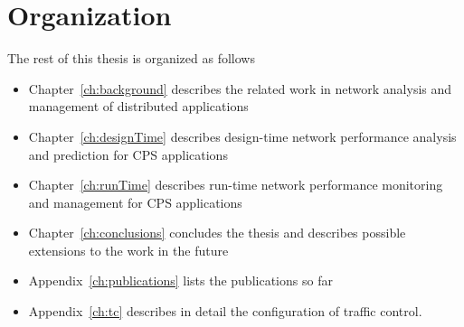 \section{Organization}
\label{sec:organization}
The rest of this thesis is organized as follows
\begin{itemize}
\item Chapter~\ref{ch:background} describes the related work in
  network analysis and management of distributed applications
\item Chapter~\ref{ch:designTime} describes design-time network
  performance analysis and prediction for CPS applications
\item Chapter~\ref{ch:runTime} describes run-time network performance
  monitoring and management for CPS applications
\item Chapter~\ref{ch:conclusions} concludes the thesis and describes
  possible extensions to the work in the future
\item Appendix~\ref{ch:publications} lists the publications so far
\item Appendix~\ref{ch:tc} describes in detail the configuration of
  traffic control.
\end{itemize}



\iffalse



